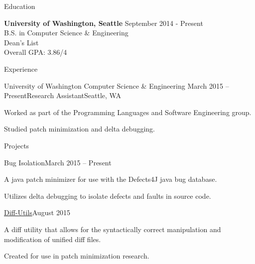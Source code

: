 \documentclass{resume} %
\begin{document}

\begin{rSection}{Education}

{\bf University of Washington, Seattle} \hfill {September 2014 - Present}
\\ B.S. in Computer Science \& Engineering \\ Dean's List \\ Overall GPA: 3.86/4

\end{rSection}


\begin{rSection}{Experience}

  \begin{rSubsection}{University of Washington Computer Science \& Engineering}
    {March 2015 -- Present}{Research Assistant}{Seattle, WA}
  \item Worked as part of the Programming Languages and Software Engineering
    group.
  \item Studied patch minimization and delta debugging.
  \end{rSubsection}

\end{rSection}


\begin{rSection}{Projects}

\begin{rSubsection}{Bug Isolation}{March 2015 -- Present}{}{}
\item A java patch minimizer for use with the Defects4J java bug database.
\item Utilizes delta debugging to isolate defects and faults in source code.
\end{rSubsection}

\begin{rSubsection}{\href{https://github.com/dericp/diff-utils}{Diff-Utils}}{August 2015}{}{}
\item A diff utility that allows for the syntactically correct manipulation and
  modification of unified diff files.
\item Created for use in patch minimization research.
\end{rSubsection}

\end{rSection}
\end{document}
